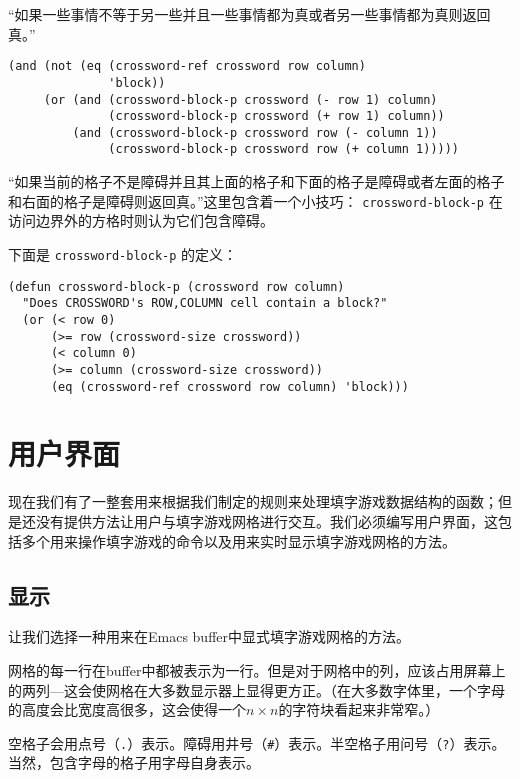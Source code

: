 “如果一些事情不等于另一些并且一些事情都为真或者另一些事情都为真则返回真。”

\begin{verbatim}
(and (not (eq (crossword-ref crossword row column)
              'block))
     (or (and (crossword-block-p crossword (- row 1) column)
              (crossword-block-p crossword (+ row 1) column))
         (and (crossword-block-p crossword row (- column 1))
              (crossword-block-p crossword row (+ column 1)))))
\end{verbatim}

“如果当前的格子不是障碍并且其上面的格子和下面的格子是障碍或者左面的格子和右面的格子是障碍则返回真。”这里包含着一个小技巧： \texttt{crossword-block-p} 在访问边界外的方格时则认为它们包含障碍。

下面是 \texttt{crossword-block-p} 的定义：

\begin{verbatim}
(defun crossword-block-p (crossword row column)
  "Does CROSSWORD's ROW,COLUMN cell contain a block?"
  (or (< row 0)
      (>= row (crossword-size crossword))
      (< column 0)
      (>= column (crossword-size crossword))
      (eq (crossword-ref crossword row column) 'block)))
\end{verbatim}

\section{用户界面}
\label{section:10-User-Interface}

现在我们有了一整套用来根据我们制定的规则来处理填字游戏数据结构的函数；但是还没有提供方法让用户与填字游戏网格进行交互。我们必须编写用户界面，这包括多个用来操作填字游戏的命令以及用来实时显示填字游戏网格的方法。

\subsection{显示}
\label{section:10-Display}

让我们选择一种用来在Emacs buffer中显式填字游戏网格的方法。

网格的每一行在buffer中都被表示为一行。但是对于网格中的列，应该占用屏幕上的两列---这会使网格在大多数显示器上显得更方正。（在大多数字体里，一个字母的高度会比宽度高很多，这会使得一个$n \times n$的字符块看起来非常窄。）

空格子会用点号（\verb|.|）表示。障碍用井号（\verb|#|）表示。半空格子用问号（\verb|?|）表示。当然，包含字母的格子用字母自身表示。

